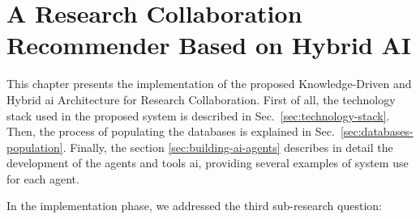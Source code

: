 \chapter{A Research Collaboration Recommender Based on Hybrid AI}\label{chap:ArtifactDevelopment}

This chapter presents the implementation of the proposed Knowledge-Driven and Hybrid \gls{ai} Architecture for Research Collaboration.
First of all, the technology stack used in the proposed system is described in Sec.~\ref{sec:technology-stack}.
Then, the process of populating the databases is explained in Sec.~\ref{sec:databases-population}.
Finally, the section \ref{sec:building-ai-agents} describes in detail the development of the agents and tools \gls{ai}, providing several examples of system use for each agent.

In the implementation phase, we addressed the third sub-research question:
\begin{center}
    \rqThree
\end{center}

